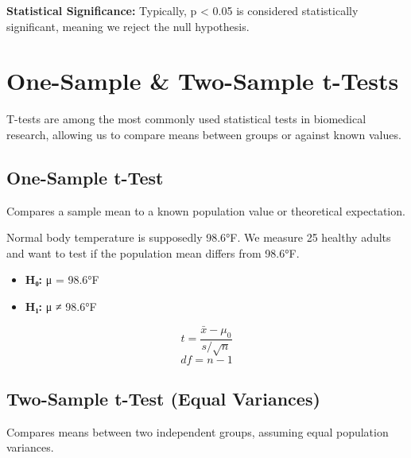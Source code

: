 \documentclass[
  11pt,
  letterpaper,
  oneside]{book}
\providecommand{\tightlist}{%
  \setlength{\itemsep}{0pt}\setlength{\parskip}{0pt}}\usepackage{longtable,booktabs,array}
\begin{document}
\textbf{Statistical Significance:} Typically, p \textless{} 0.05 is
considered statistically significant, meaning we reject the null
hypothesis.

\section{One-Sample \& Two-Sample
t-Tests}\label{one-sample-two-sample-t-tests}

T-tests are among the most commonly used statistical tests in biomedical
research, allowing us to compare means between groups or against known
values.

\subsection{One-Sample t-Test}\label{one-sample-t-test}

Compares a sample mean to a known population value or theoretical
expectation.

\begin{tcolorbox}[enhanced jigsaw, toprule=.15mm, left=2mm, opacitybacktitle=0.6, colframe=quarto-callout-tip-color-frame, leftrule=.75mm, titlerule=0mm, coltitle=black, colbacktitle=quarto-callout-tip-color!10!white, toptitle=1mm, title=\textcolor{quarto-callout-tip-color}{\faLightbulb}\hspace{0.5em}{One-Sample Example}, bottomtitle=1mm, arc=.35mm, rightrule=.15mm, bottomrule=.15mm, breakable, opacityback=0, colback=white]

Normal body temperature is supposedly 98.6°F. We measure 25 healthy
adults and want to test if the population mean differs from 98.6°F.

\begin{itemize}
\tightlist
\item
  \textbf{H₀:} μ = 98.6°F
\item
  \textbf{H₁:} μ ≠ 98.6°F
\end{itemize}

\end{tcolorbox}

\[t = \frac{\bar{x} - \mu_0}{s/\sqrt{n}}\] \[df = n - 1\]

\subsection{Two-Sample t-Test (Equal
Variances)}\label{two-sample-t-test-equal-variances}

Compares means between two independent groups, assuming equal population
variances.
\end{document}
